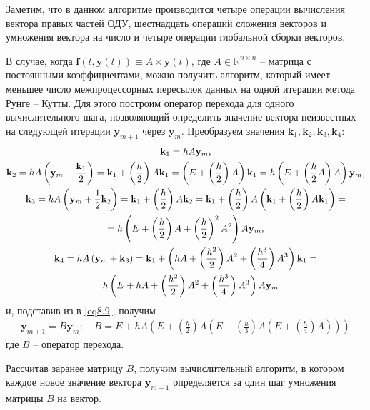 \documentclass[14pt,final,titlepage,pscyr]{hedwork}
\renewcommand{\vec}[1]{\mathbf{#1}}
\begin{document}
	Заметим, что в данном алгоритме производится четыре операции вычисления вектора правых частей ОДУ, 
	шестнадцать операций сложения векторов и умножения вектора на число и четыре операции глобальной 
	сборки векторов. 

	В случае, когда \( \vec{f}(t, \vec{y}(t)) \equiv A \times \vec{y}(t) \), где 
	\( A \in \mathbb{R}^{n\times n} \) -- матрица с постоянными коэффициентами, можно получить алгоритм, 
	который имеет меньшее число межпроцессорных пересылок данных на одной итерации метода Рунге -- Кутты. 
	Для этого построим оператор перехода для одного вычислительного шага, позволяющий определить 
	значение вектора неизвестных на следующей итерации \( \vec{y}_{m+1} \) через \( \vec{y}_m \). 
	Преобразуем значения \( \vec{k}_1, \vec{k}_2, \vec{k}_3, \vec{k}_4 \):
	\begin{gather}
		\vec{k}_1 = hA\vec{y}_m, \notag \\
		\vec{k}_2 = hA\left(\vec{y}_m + \frac{\vec{k}_1}{2}\right) = 
			\vec{k}_1 + \left(\frac{h}{2}\right)A\vec{k}_1 = 
			\left( E + \left(\frac{h}{2}\right)A \right)\vec{k}_1 = 
			h\left( E + \left(\frac{h}{2}A \right)A \right) \vec{y}_m, \notag \\
		\vec{k}_3 = hA\left( \vec{y}_m + \frac{1}{2}\vec{k}_2 \right) = 
			\vec{k}_1 + \left( \frac{h}{2} \right)A\vec{k}_2 = 
			\vec{k}_1 + \left( \frac{h}{2} \right)A\left( \vec{k}_1 + 
			\left( \frac{h}{2} \right)A\vec{k}_1 \right) = \notag \\ =
			h\left( E + \left( \frac{h}{2} \right)A + \left( \frac{h}{2} \right)^2 A^2 \right)A\vec{y}_m, 
		\notag \\
		\vec{k}_4 = hA\left( \vec{y}_m + \vec{k}_3 \right) = 
			\vec{k}_1 + \left( hA + \left( \frac{h^2}{2} \right)A^2 + 
				\left( \frac{h^3}{4} \right)A^3 \right)\vec{k}_1 = \notag \\ = 
			h\left( E + hA + \left( \frac{h^2}{2} \right)A^2 + 
				\left( \frac{h^3}{4} \right)A^3 \right)A\vec{y}_m
		\notag
	\end{gather}
	и, подставив из в \eqref{eq8.9}, получим
	\begin{gather}
		\vec{y}_{m+1} = B\vec{y}_m; \quad
		B = E + hA\left( E + \left( \frac{h}{2} \right)A\left( 
			E + \left( \frac{h}{3} \right) A \left( E + \left( \frac{h}{4} \right)A \right) 
		\right) \right)
		\label{eq8.10}
	\end{gather}
	где \( B \) -- оператор перехода.

	Рассчитав заранее матрицу \( B \), получим вычислительный алгоритм, в котором каждое новое значение 
	вектора \( \vec{y}_{m+1} \) определяется за один шаг умножения матрицы \( B \) на вектор.
\end{document}
